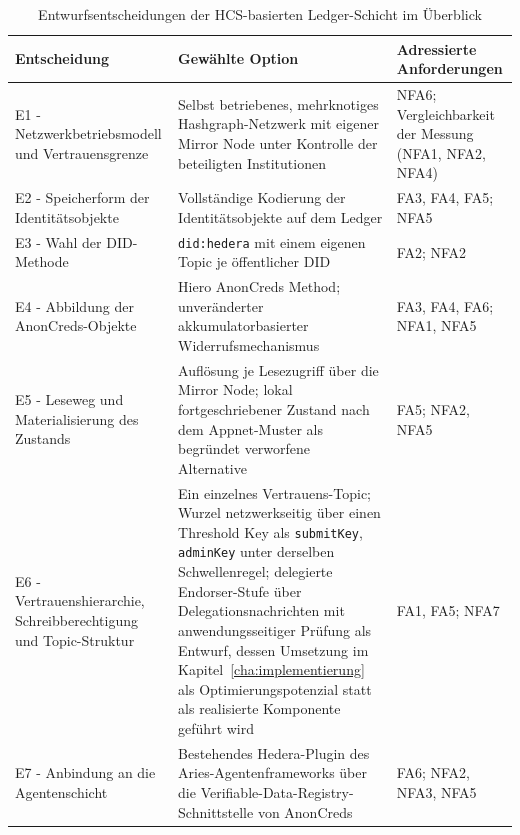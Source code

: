 \begin{table}[htbp]
\renewcommand{\arraystretch}{1.3}
\footnotesize
  \centering
  \caption{Entwurfsentscheidungen der HCS-basierten Ledger-Schicht im Überblick}
  \label{tab:entwurfsentscheidungen}
  \begin{tabular}{p{} p{} p{}}
    \toprule
    \textbf{Entscheidung} & \textbf{Gewählte Option} & \textbf{Adressierte Anforderungen} \\
    \midrule
    E1 - Netzwerkbetriebsmodell und Vertrauensgrenze & Selbst betriebenes, mehrknotiges Hashgraph-Netzwerk mit eigener Mirror Node unter Kontrolle der beteiligten Institutionen & NFA6; Vergleichbarkeit der Messung (NFA1, NFA2, NFA4) \\
    E2 - Speicherform der Identitätsobjekte & Vollständige Kodierung der Identitätsobjekte auf dem Ledger & FA3, FA4, FA5; NFA5 \\
    E3 - Wahl der DID-Methode & \texttt{did:hedera} mit einem eigenen Topic je öffentlicher DID & FA2; NFA2 \\
    E4 - Abbildung der AnonCreds-Objekte & Hiero AnonCreds Method; unveränderter akkumulatorbasierter Widerrufsmechanismus & FA3, FA4, FA6; NFA1, NFA5 \\
    E5 - Leseweg und Materialisierung des Zustands & Auflösung je Lesezugriff über die Mirror Node; lokal fortgeschriebener Zustand nach dem Appnet-Muster als begründet verworfene Alternative & FA5; NFA2, NFA5 \\
        E6 - Vertrauenshierarchie, Schreibberechtigung und Topic-Struktur & Ein einzelnes Vertrauens-Topic; Wurzel netzwerkseitig über einen Threshold Key als \texttt{submitKey}, \texttt{adminKey} unter derselben Schwellenregel; delegierte Endorser-Stufe über Delegationsnachrichten mit anwendungsseitiger Prüfung als Entwurf, dessen Umsetzung im Kapitel~\ref{cha:implementierung} als Optimierungspotenzial statt als realisierte Komponente geführt wird & FA1, FA5; NFA7 \\
    E7 - Anbindung an die Agentenschicht & Bestehendes Hedera-Plugin des Aries-Agentenframeworks über die Verifiable-Data-Registry-Schnittstelle von AnonCreds & FA6; NFA2, NFA3, NFA5 \\
    \bottomrule
  \end{tabular}
\end{table}
\normalsize


